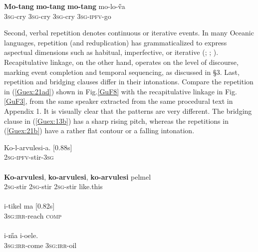 \documentclass[output=paper]{LSP/langsci}
\begin{document}
\begin{exe}
\ex \label{Guex:20}
\gll    \textbf{Mo-tang}     \textbf{mo-tang}   \textbf{mo-tang} mo-lo-\H{v}a\\     	       
 \textsc{3sg}-cry    \textsc{3sg}-cry  \textsc{3sg}-cry  \textsc{3sg-ipfv}-go\\
\glt {} \citep[][266]{guerin11}
\end{exe}


Second, verbal repetition denotes continuous or iterative events. In many Oceanic languages, repetition (and reduplication) has grammaticalized to express aspectual dimensions such as habitual, imperfective, or iterative (\citealt[][487]{besnier00}; \citealt[][117]{guerin11}; \citealt[][260]{dimock09}). Recapitulative linkage, on the other hand, operates on the level of discourse, marking event completion and temporal sequencing, as discussed in §3. Last, repetition and bridging clauses differ in their intonations.  Compare  the repetition in (\ref{Guex:21ad}) shown in Fig.\ref{GuF8} with the recapitulative linkage in Fig.\ref{GuF3}, from the same speaker extracted from the same procedural text in Appendix 1. It is  visually clear that the patterns are very different. The bridging clause in (\ref{Guex:13b}) has a sharp rising pitch, whereas the repetitions in (\ref{Guex:21b}) have a rather flat contour or a falling intonation.

\begin{exe}
\ex \label{Guex:21ad}
\begin{xlist}
\ex \label{Guex:21a}
\gll Ko-l-arvulesi-a. [0.88s]       \\
\textsc{2sg-ipfv-}stir-\textsc{3sg}      \\
\glt {}\\
\ex \label{Guex:21b}
\gll \textbf{Ko-arvulesi},   \textbf{ko-arvulesi}, \textbf{ko-arvulesi} pelmel    \\
 \textsc{2sg-}stir \textsc{2sg-}stir \textsc{2sg-}stir  like.this \\
\glt {}\\
\ex \label{Guex:21c}
\gll   i-tikel              ma  [0.82s] \\
   \textsc{3sg}:\textsc{irr}-reach     \textsc{comp} \\
\glt {}\\
\ex \label{Guex:21d}
\gll   i-\H{m}a        i-oele.\\     	       
 \textsc{3sg}:\textsc{irr}-come     \textsc{3sg}:\textsc{irr}-oil\\
\glt {} 
\end{xlist}
\end{exe}
\end{document}
